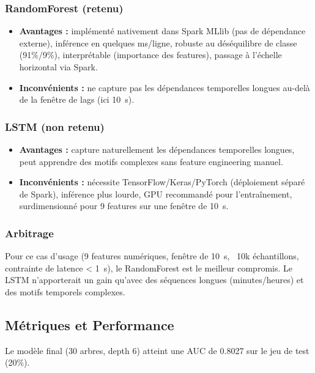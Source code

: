 \documentclass[11pt,a4paper]{article}
\begin{document}
\subsubsection{RandomForest (retenu)}

\begin{itemize}
    \item \textbf{Avantages :} implémenté nativement dans Spark MLlib (pas de dépendance externe), inférence en quelques ms/ligne, robuste au déséquilibre de classe (91\%/9\%), interprétable (importance des features), passage à l'échelle horizontal via Spark.
    \item \textbf{Inconvénients :} ne capture pas les dépendances temporelles longues au-delà de la fenêtre de lags (ici 10~s). 
\end{itemize}

\subsubsection{LSTM (non retenu)}

\begin{itemize}
    \item \textbf{Avantages :} capture naturellement les dépendances temporelles longues, peut apprendre des motifs complexes sans feature engineering manuel.
    \item \textbf{Inconvénients :} nécessite TensorFlow/Keras/PyTorch (déploiement séparé de Spark), inférence plus lourde, GPU recommandé pour l'entraînement, surdimensionné pour 9 features sur une fenêtre de 10~s.
\end{itemize}

\subsubsection{Arbitrage}

Pour ce cas d'usage (9 features numériques, fenêtre de 10~s, ~10k échantillons, contrainte de latence < 1~s), le RandomForest est le meilleur compromis. Le LSTM n'apporterait un gain qu'avec des séquences longues (minutes/heures) et des motifs temporels complexes.

\subsection{Métriques et Performance}

Le modèle final (30 arbres, depth 6) atteint une AUC de 0.8027 sur le jeu de test (20\%). 
\end{document}
